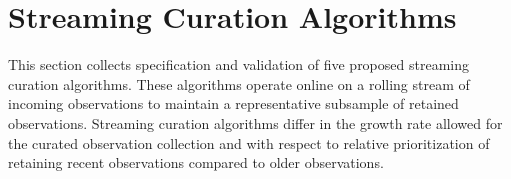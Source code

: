 \section{Streaming Curation Algorithms} \label{sec:annotation-algorithms}



This section collects specification and validation of five proposed streaming curation algorithms.
These algorithms operate online on a rolling stream of incoming observations to maintain a representative subsample of retained observations.
Streaming curation algorithms differ in the growth rate allowed for the curated observation collection and with respect to relative prioritization of retaining recent observations compared to older observations.


